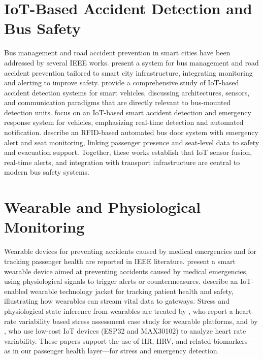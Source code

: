 \documentclass[conference]{IEEEtran}
\begin{document}
\section{IoT-Based Accident Detection and Bus Safety}

Bus management and road accident prevention in smart cities have been addressed by several IEEE works. \cite{ieee_bus_mgmt} present a system for bus management and road accident prevention tailored to smart city infrastructure, integrating monitoring and alerting to improve safety. \cite{ieee_comprehensive_iot_accident} provide a comprehensive study of IoT-based accident detection systems for smart vehicles, discussing architectures, sensors, and communication paradigms that are directly relevant to bus-mounted detection units. \cite{ieee_iot_accident_emergency} focus on an IoT-based smart accident detection and emergency response system for vehicles, emphasizing real-time detection and automated notification. \cite{ieee_rfid_bus_door} describe an RFID-based automated bus door system with emergency alert and seat monitoring, linking passenger presence and seat-level data to safety and evacuation support. Together, these works establish that IoT sensor fusion, real-time alerts, and integration with transport infrastructure are central to modern bus safety systems.

\section{Wearable and Physiological Monitoring}

Wearable devices for preventing accidents caused by medical emergencies and for tracking passenger health are reported in IEEE literature. \cite{ieee_smart_wearable_medical} present a smart wearable device aimed at preventing accidents caused by medical emergencies, using physiological signals to trigger alerts or countermeasures. \cite{ieee_wearable_jacket} describe an IoT-enabled wearable technology jacket for tracking patient health and safety, illustrating how wearables can stream vital data to gateways. Stress and physiological state inference from wearables are treated by \cite{ieee_hrv_stress_wearable}, who report a heart-rate variability based stress assessment case study for wearable platforms, and by \cite{ieee_esp32_stress}, who use low-cost IoT devices (ESP32 and MAX30102) to analyze heart rate variability. These papers support the use of HR, HRV, and related biomarkers—as in our passenger health layer—for stress and emergency detection.
\end{document}
